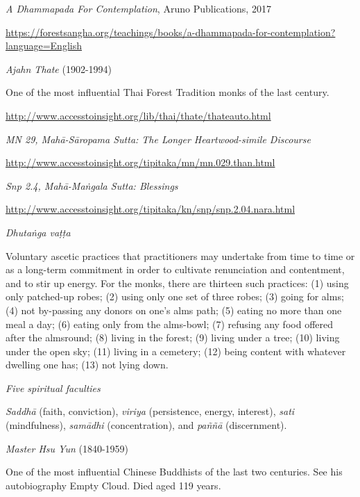 \begin{thebibliography}{9}

 \emph{A Dhammapada For Contemplation}, Aruno Publications, 2017

  {\urlsize \url{https://forestsangha.org/teachings/books/a-dhammapada-for-contemplation?language=English}}

 \emph{Ajahn Thate} (1902-1994)

  One of the most influential Thai Forest Tradition monks of the last century.

  {\urlsize \url{http://www.accesstoinsight.org/lib/thai/thate/thateauto.html}}

 \emph{MN 29, Mahā-Sāropama Sutta: The Longer Heartwood-simile Discourse}

  {\urlsize \url{http://www.accesstoinsight.org/tipitaka/mn/mn.029.than.html}}

 \emph{Snp 2.4, Mahā-Maṅgala Sutta: Blessings}

  {\urlsize \url{http://www.accesstoinsight.org/tipitaka/kn/snp/snp.2.04.nara.html}}

 \emph{Dhutaṅga vaṭṭa}

  Voluntary ascetic practices that practitioners may undertake from time to time
  or as a long-term commitment in order to cultivate renunciation and
  contentment, and to stir up energy. For the monks, there are thirteen such
  practices: (1) using only patched-up robes; (2) using only one set of three
  robes; (3) going for alms; (4) not by-passing any donors on one’s alms path;
  (5) eating no more than one meal a day; (6) eating only from the alms-bowl;
  (7) refusing any food offered after the almsround; (8) living in the forest;
  (9) living under a tree; (10) living under the open sky; (11) living in a
  cemetery; (12) being content with whatever dwelling one has; (13) not lying
  down.

 \emph{Five spiritual faculties}

  \emph{Saddhā} (faith, conviction), \emph{viriya} (persistence, energy,
  interest), \emph{sati} (mindfulness), \emph{samādhi} (concentration), and
  \emph{paññā} (discernment).

 \emph{Master Hsu Yun} (1840-1959)

  One of the most influential Chinese Buddhists of the last two centuries. See
  his autobiography Empty Cloud. Died aged 119 years.


\end{thebibliography}
